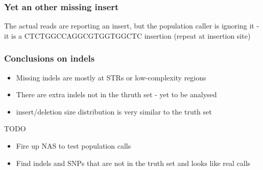 \documentclass{beamer}
\begin{document}
\begin{frame}
\frametitle{Yet an other missing insert}
The actual reads are reporting an insert, but the population caller is ignoring it - 
it is a CTCTGGCCAGGCGTGGTGGCTC insertion (repeat at insertion site)
\end{frame}

\begin{frame}
	\frametitle{Conclusions on indels}
	\begin{itemize}
		\item Missing indels are mostly at STRs or low-complexity regions
		\item There are extra indels not in the thruth set - yet to be analysed
		\item insert/deletion size distribution is very similar to the truth set
	\end{itemize}
	\begin{block}{TODO}
		\begin{itemize}
			\item Fire up NAS to test population calls
			\item Find indels and SNPs that are not in the truth set and looks like real calls 
		\end{itemize}
	\end{block}
\end{frame}
\end{document}
